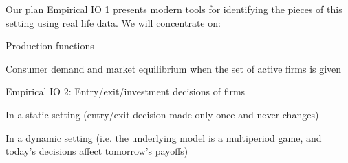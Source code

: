 

\begin{frame}{Our plan}
	Empirical IO 1 presents modern tools for identifying the pieces of this setting using real life data. We will concentrate on:
	\bi
		\item{Production functions}
		\item{Consumer demand and market equilibrium when the set of active firms is given}

	\ei
			Empirical IO 2: Entry/exit/investment decisions of firms
			\bi
				\item{In a static setting (entry/exit decision made only once and never changes)}
				\item{In a dynamic setting (i.e. the underlying model is a multiperiod game, and today's decisions affect tomorrow's payoffs)}
			\ei
\end{frame}

